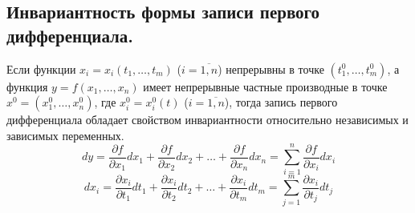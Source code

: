 \documentclass[12pt]{article}
\begin{document}
    \subsection{Инвариантность формы записи первого дифференциала.}
    Если функции $x_i = x_i(t_1, \dots, t_m)$ ($i = \overline{1,n}$) непрерывны в точке $(t^0_1, \dots, t^0_m)$, а функция $y = f(x_1, \dots, x_n)$ имеет непрерывные частные производные в точке $x^0 = (x^0_1, \dots, x^0_n)$, где $x^0_i = x^0_i(t)$ ($i = \overline{1,n}$), тогда запись первого дифференциала обладает свойством инвариантности относительно независимых и зависимых переменных.
    \[ dy = \frac{\partial f}{\partial x_1}dx_1 + \frac{\partial f}{\partial x_2}dx_2 + \dots + \frac{\partial f}{\partial x_n}dx_n = \sum_{i=1}^{n}\frac{\partial f}{\partial x_i}dx_i \]
    \[ dx_i = \frac{\partial x_i}{\partial t_1}dt_1 + \frac{\partial x_i}{\partial t_2}dt_2 + \dots + \frac{\partial x_i}{\partial t_m}dt_m = \sum_{j=1}^{m} \frac{\partial x_i}{\partial t_j}dt_j \]
\end{document}

